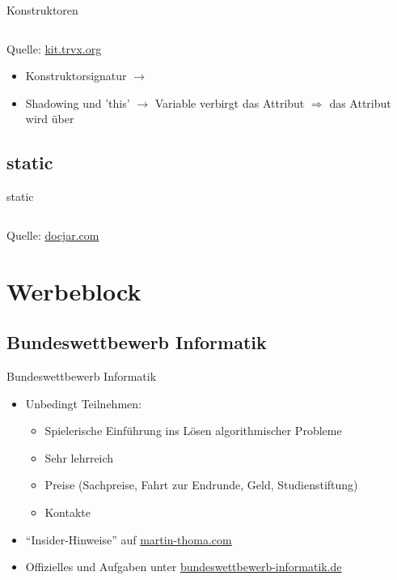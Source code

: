 \documentclass[usepdftitle=false,hyperref={pdfpagelabels=false}]{beamer}
\begin{document}
\begin{frame}{Konstruktoren}
    \inputminted[linenos, numbersep=5pt, tabsize=4, frame=lines, label=Shark.java, fontsize=\tiny]{java}{Shark-constructor.java}
    {\tiny Quelle: \href{http://kit.trvx.org/build/tutorial-02.html\#/8}{kit.trvx.org}}
    \newline
    \newline
    \begin{itemize}
        \item Konstruktorsignatur $\rightarrow$ 
        \item Shadowing und 'this' $\rightarrow$ Variable  verbirgt das Attribut 
              $\Rightarrow$ das Attribut wird über 
    \end{itemize}
\end{frame}

\subsection{static}
\begin{frame}{static}
    \inputminted[linenos, numbersep=5pt, tabsize=4, frame=lines, label=Math.java, fontsize=\tiny]{java}{Math.java}
    {\tiny Quelle: \href{http://www.docjar.com/html/api/java/lang/Math.java.html}{docjar.com}}
    \newline
    \newline
\end{frame}

\section{Werbeblock}
\subsection{Bundeswettbewerb Informatik}
\begin{frame}{Bundeswettbewerb Informatik}
    \begin{itemize}[<+->]
        \item Unbedingt Teilnehmen:
          \begin{itemize}
             \item Spielerische Einführung ins Lösen algorithmischer Probleme
             \item Sehr lehrreich
             \item Preise (Sachpreise, Fahrt zur Endrunde, Geld, Studienstiftung)
             \item Kontakte
          \end{itemize}
        \item "`Insider-Hinweise"' auf \href{http://martin-thoma.com/bundeswettbewerb-informatik/}{martin-thoma.com}
        \item Offizielles und Aufgaben unter \href{http://www.bundeswettbewerb-informatik.de/}{bundeswettbewerb-informatik.de}
    \end{itemize}
\end{frame}
\end{document}
